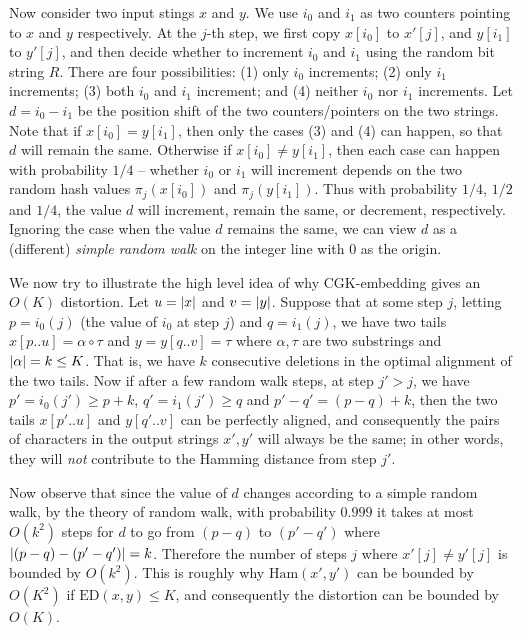 Now consider two input stings $x$ and $y$.  We use $i_0$ and $i_1$ as two counters pointing to $x$ and $y$ respectively.   At the $j$-th step, we first copy $x[i_0]$ to $x'[j]$, and $y[i_1]$ to $y'[j]$, and then decide whether to increment $i_0$ and $i_1$ using the random bit string $R$.  There are four possibilities: (1) only $i_0$ increments; (2) only $i_1$ increments; (3) both $i_0$ and $i_1$ increment; and (4) neither $i_0$ nor $i_1$ increments.  Let $d = i_0 - i_1$ be the position shift of the two counters/pointers on the two strings.  Note that if $x[i_0] = y[i_1]$, then only the cases (3) and (4) can happen, so that $d$ will remain the same.  Otherwise if $x[i_0] \neq y[i_1]$, then each case can happen with probability $1/4$ -- whether $i_0$ or $i_1$ will increment depends on the two random hash values $\pi_j(x[i_0])$ and $\pi_j(y[i_1])$. Thus with probability $1/4$, $1/2$ and $1/4$, the value $d$ will increment, remain the same, or decrement, respectively.  Ignoring the case when the value $d$ remains the same, we can view $d$ as a (different) {\em simple random walk} on the integer line with $0$ as the origin.  

We now try to illustrate the high level idea of why CGK-embedding gives an $O(K)$ distortion.  Let $u = \left| x \right|$ and $v = \left| y \right|$.  Suppose that at some step $j$, letting $p = i_0(j)$ (the value of $i_0$ at step $j$) and $q = i_1(j)$, we have two tails $x[p .. u] = \alpha \circ \tau$ and $y = y[q .. v] = \tau$ where $\alpha, \tau$ are two substrings and $\left| \alpha \right| = k \le K$. That is, we have $k$ consecutive deletions in the optimal alignment of the two tails.  Now if after a few random walk steps, at step $j' > j$, we have $p' = i_0(j') \ge p + k$, $q' = i_1(j') \ge q$ and $p' - q' = (p - q) + k$, then the two tails $x[p'..u]$ and $y[q'..v]$ can be perfectly aligned, and consequently the pairs of characters in the output strings $x', y'$ will always be the same; in other words, they will {\em not} contribute to the Hamming distance from step $j'$. 

Now observe that since the value of $d$ changes according to a simple random walk, by the theory of random walk, with probability $0.999$ it takes at most $O(k^2)$ steps for $d$ to go from $(p - q)$ to $(p' - q')$ where $\left| (p - q) - (p' - q') \right| = k$.  Therefore the number of steps $j$ where $x'[j] \neq y'[j]$ is bounded by $O(k^2)$.  
This is roughly why $\text{Ham}(x', y')$ can be bounded by $O(K^2)$ if $\text{ED}(x, y) \le K$, and consequently the distortion can be bounded by $O(K)$.

